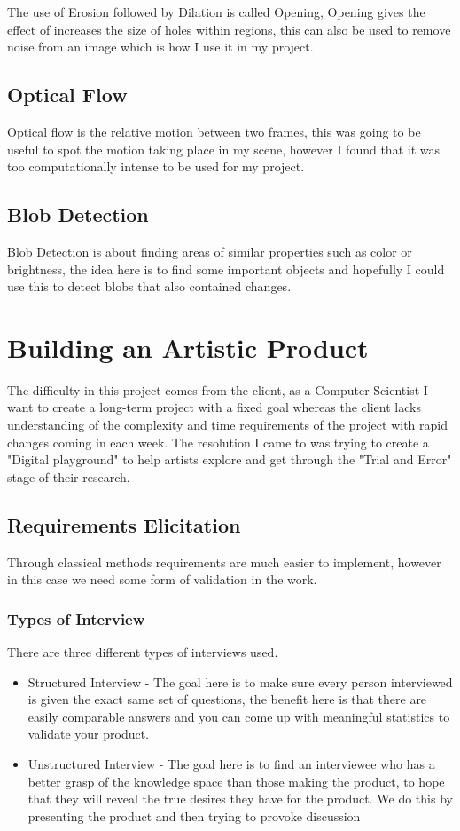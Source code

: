 \documentclass[a4paper]{report}
\begin{document}
The use of Erosion followed by Dilation is called Opening, Opening gives the effect of increases the size of holes within regions, this can also be used to remove noise from an image which is how I use it in my project.

\subsection{Optical Flow}
Optical flow is the relative motion between two frames, this was going to be useful to spot the motion taking place in my scene, however I found that it was too computationally intense to be used for my project.

\subsection{Blob Detection}
Blob Detection is about finding areas of similar properties such as color or brightness, the idea here is to find some important objects and hopefully I could use this to detect blobs that also contained changes.

\section{Building an Artistic Product}
The difficulty in this project comes from the client, as a Computer Scientist I want to create a long-term project with a fixed goal whereas the client lacks understanding of the complexity and time requirements of the project with rapid changes coming in each week. The resolution I came to was trying to create a "Digital playground" to help artists explore and get through the "Trial and Error" stage of their research.

\subsection{Requirements Elicitation}
Through classical methods requirements are much easier to implement, however in this case we need some form of validation in the work.

\subsubsection{Types of Interview}
There are three different types of interviews used.

\begin{itemize}
\item Structured Interview - The goal here is to make sure every person interviewed is given the exact same set of questions, the benefit here is that there are easily comparable answers and you can come up with meaningful statistics to validate your product.

\item Unstructured Interview - The goal here is to find an interviewee who has a better grasp of the knowledge space than those making the product, to hope that they will reveal the true desires they have for the product. We do this by presenting the product and then trying to provoke discussion
\end{itemize}
\end{document}

